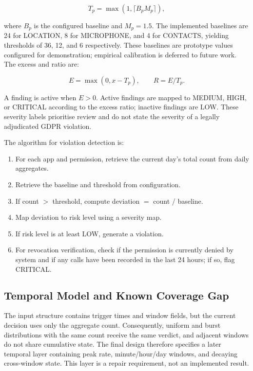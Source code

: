 \begin{equation}
T_p=\max(1,\lceil B_pM_p\rceil),
\end{equation}

where $B_p$ is the configured baseline and $M_p=1.5$. The implemented baselines are 24 for LOCATION, 8 for MICROPHONE, and 4 for CONTACTS, yielding thresholds of 36, 12, and 6 respectively. These baselines are prototype values configured for demonstration; empirical calibration is deferred to future work. The excess and ratio are:

\begin{equation}
E=\max(0,x-T_p),\qquad R=E/T_p.
\end{equation}

A finding is active when $E>0$. Active findings are mapped to MEDIUM, HIGH, or CRITICAL according to the excess ratio; inactive findings are LOW. These severity labels prioritise review and do not state the severity of a legally adjudicated GDPR violation.

The algorithm for violation detection is:
\begin{enumerate}
\item For each app and permission, retrieve the current day's total count from daily aggregates.
\item Retrieve the baseline and threshold from configuration.
\item If count $>$ threshold, compute deviation $=$ count / baseline.
\item Map deviation to risk level using a severity map.
\item If risk level is at least LOW, generate a violation.
\item For revocation verification, check if the permission is currently denied by system and if any calls have been recorded in the last 24 hours; if so, flag CRITICAL.
\end{enumerate}

\subsection{Temporal Model and Known Coverage Gap}

The input structure contains trigger times and window fields, but the current decision uses only the aggregate count. Consequently, uniform and burst distributions with the same count receive the same verdict, and adjacent windows do not share cumulative state. The final design therefore specifies a later temporal layer containing peak rate, minute/hour/day windows, and decaying cross-window state. This layer is a repair requirement, not an implemented result.

